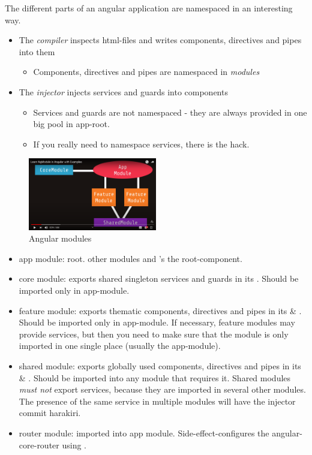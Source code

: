 The different parts of an angular application are namespaced in an interesting way.
\begin{itemize}
    \item The \emph{compiler} inspects html-files and writes components, directives and pipes into them
    \begin{itemize}
        \item Components, directives and pipes are namespaced in \emph{modules}
    \end{itemize}
    \item The \emph{injector} injects services and guards into components
    \begin{itemize}
        \item Services and guards are not namespaced - they are always provided in one big pool in app-root.
        \item If you really need to namespace services, there is the  hack.
    \end{itemize}
\end{itemize}


\begin{figure}
    \caption{Angular modules}
    \centering
    \includegraphics[width=0.5\textwidth]{images/angular_modules.png}
\end{figure}

\begin{itemize}
    \item app module: root.  other modules and 's the root-component.
    \item core module: exports shared singleton services and guards in its . Should be imported only in app-module.
    \item feature module: exports thematic components, directives and pipes in its  & . Should be imported only in app-module.
                If necessary, feature modules may provide services, but then you need to make sure that the module is only imported in one single place (usually the app-module).
    \item shared module: exports globally used components, directives and pipes in its  & . Should be imported into any module that requires it.
                Shared modules \emph{must not} export services, because they are imported in several other modules. The presence of the same service in multiple modules will have the injector commit harakiri.
    \item router module: imported into app module. Side-effect-configures the angular-core-router using .
\end{itemize}